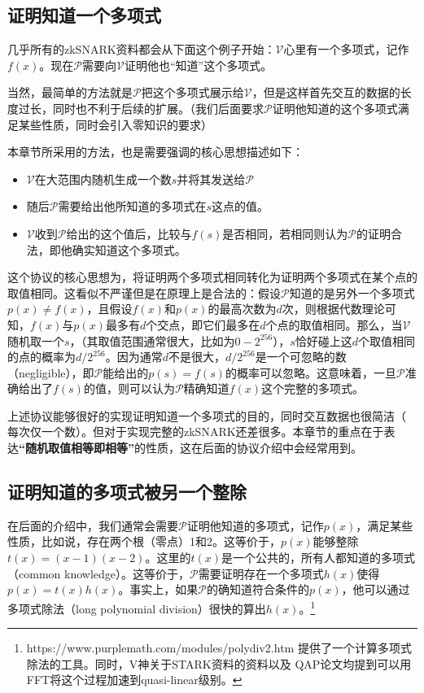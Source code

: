 \documentclass[12pt]{article}
\newcommand{\zk}{zkSNARK}
\newcommand{\pp}{$\mathcal{P}$}
\newcommand{\vv}{$\mathcal{V}$}
\begin{document}
\subsection{证明知道一个多项式}
几乎所有的\zk 资料都会从下面这个例子开始：\vv 心里有一个多项式，记作$f(x)$。现在\pp 需要向\vv 证明他也“知道”这个多项式。

当然，最简单的方法就是\pp 把这个多项式展示给\vv，但是这样首先交互的数据的长度过长，同时也不利于后续的扩展。（我们后面要求\pp 证明他知道的这个多项式满足某些性质，同时会引入零知识的要求）

本章节所采用的方法，也是需要强调的核心思想描述如下：
\begin{itemize}
	\item \vv 在大范围内随机生成一个数$s$并将其发送给\pp
	\item 随后\pp 需要给出他所知道的多项式在$s$这点的值。
	\item \vv 收到\pp 给出的这个值后，比较与$f(s)$是否相同，若相同则认为\pp 的证明合法，即他确实知道这个多项式。
\end{itemize}

这个协议的核心思想为，将证明两个多项式相同转化为证明两个多项式在某个点的取值相同。这看似不严谨但是在原理上是合法的：假设\pp 知道的是另外一个多项式$p(x)\neq f(x)$，且假设$f(x)$和$p(x)$的最高次数为$d$次，则根据代数理论可知，$f(x)$与$p(x)$最多有$d$个交点，即它们最多在$d$个点的取值相同。那么，当\vv 随机取一个$s$，（其取值范围通常很大，比如为$0-2^{256}$），$s$恰好碰上这$d$个取值相同的点的概率为$d/2^{256}$。因为通常$d$不是很大，$d/2^{256}$是一个可忽略的数（negligible），即\pp 能给出的$p(s)=f(s)$的概率可以忽略。这意味着，一旦\pp 准确给出了$f(s)$的值，则可以认为\pp 精确知道$f(x)$这个完整的多项式。

上述协议能够很好的实现证明知道一个多项式的目的，同时交互数据也很简洁（ 每次仅一个数）。但对于实现完整的\zk 还差很多。本章节的重点在于表达\textbf{“随机取值相等即相等”}的性质，这在后面的协议介绍中会经常用到。
\subsection{证明知道的多项式被另一个整除}
\label{sec:div}
在后面的介绍中，我们通常会需要\pp 证明他知道的多项式，记作$p(x)$，满足某些性质，比如说，存在两个根（零点）1和2。这等价于，$p(x)$能够整除$t(x)=(x-1)(x-2)$。这里的$t(x)$是一个公共的，所有人都知道的多项式（common knowledge）。这等价于，\pp 需要证明存在一个多项式$h(x)$使得$p(x)=t(x)h(x)$。事实上，如果\pp 的确知道符合条件的$p(x)$，他可以通过多项式除法（long polynomial division）很快的算出$h(x)$。\footnote{https://www.purplemath.com/modules/polydiv2.htm 提供了一个计算多项式除法的工具。同时，V神关于STARK资料的资料以及	QAP论文均提到{\color{red}可以用FFT将这个过程加速到quasi-linear级别。}}
\end{document}
